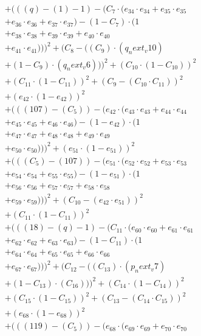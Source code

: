 \documentclass[10pt, a4paper]{article}
\begin{document}
\begin{small}
\begin{align*}
& + (((q) - (1) - 1) - (C_{7} \cdot (e_{34} \cdot e_{34} + e_{35} \cdot e_{35} \\
& + e_{36} \cdot e_{36} + e_{37} \cdot e_{37}) - (1 - C_{7}) \cdot (1 \\
& + e_{38} \cdot e_{38} + e_{39} \cdot e_{39} + e_{40} \cdot e_{40} \\
& + e_{41} \cdot e_{41})))^{2} + (C_{8} - ((C_{9})  \cdot  (q_next_v10) \\
& + (1 - C_{9})  \cdot  (q_next_v6)))^{2} + (C_{10} \cdot (1 - C_{10}))^{2} \\
& + (C_{11} \cdot (1 - C_{11}))^{2} + (C_{9} - (C_{10} \cdot C_{11}))^{2} \\
& + (e_{42} \cdot (1 - e_{42}))^{2} \\
& + (((107) - (C_{5})) - (e_{42} \cdot (e_{43} \cdot e_{43} + e_{44} \cdot e_{44} \\
& + e_{45} \cdot e_{45} + e_{46} \cdot e_{46}) - (1 - e_{42}) \cdot (1 \\
& + e_{47} \cdot e_{47} + e_{48} \cdot e_{48} + e_{49} \cdot e_{49} \\
& + e_{50} \cdot e_{50})))^{2} + (e_{51} \cdot (1 - e_{51}))^{2} \\
& + (((C_{5}) - (107)) - (e_{51} \cdot (e_{52} \cdot e_{52} + e_{53} \cdot e_{53} \\
& + e_{54} \cdot e_{54} + e_{55} \cdot e_{55}) - (1 - e_{51}) \cdot (1 \\
& + e_{56} \cdot e_{56} + e_{57} \cdot e_{57} + e_{58} \cdot e_{58} \\
& + e_{59} \cdot e_{59})))^{2} + (C_{10} - (e_{42} \cdot e_{51}))^{2} \\
& + (C_{11} \cdot (1 - C_{11}))^{2} \\
& + (((18) - (q) - 1) - (C_{11} \cdot (e_{60} \cdot e_{60} + e_{61} \cdot e_{61} \\
& + e_{62} \cdot e_{62} + e_{63} \cdot e_{63}) - (1 - C_{11}) \cdot (1 \\
& + e_{64} \cdot e_{64} + e_{65} \cdot e_{65} + e_{66} \cdot e_{66} \\
& + e_{67} \cdot e_{67})))^{2} + (C_{12} - ((C_{13})  \cdot  (p_next_v7) \\
& + (1 - C_{13})  \cdot  (C_{16})))^{2} + (C_{14} \cdot (1 - C_{14}))^{2} \\
& + (C_{15} \cdot (1 - C_{15}))^{2} + (C_{13} - (C_{14} \cdot C_{15}))^{2} \\
& + (e_{68} \cdot (1 - e_{68}))^{2} \\
& + (((119) - (C_{5})) - (e_{68} \cdot (e_{69} \cdot e_{69} + e_{70} \cdot e_{70} \\

\end{align*}
\end{small}
\end{document}
